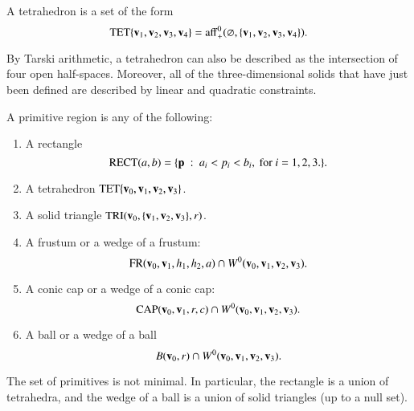 \begin{definition}[tetrahedron]
 A tetrahedron is a set of the form
\[ {\operatorname{TET}}\{{\mathbf v}_1,{\mathbf v}_2,{\mathbf v}_3,{\mathbf v}_4\} = 
{\operatorname{aff}}^0_+(\varnothing,\{{\mathbf v}_1,{\mathbf v}_2,{\mathbf v}_3,{\mathbf v}_4\}).\] 
%
\end{definition}

\begin{remark}
  By Tarski arithmetic, %
  a tetrahedron can also be described as the intersection of four open
  half-spaces. Moreover,  all of
  the three-dimensional solids that have just been defined are
  described by linear and quadratic constraints.  %
\end{remark}

%

\begin{definition}[primitive]\label{def:primitive} 
A primitive region is any of the following:

\begin{enumerate}%
\item A rectangle 
\[ 
{\operatorname{RECT}}(a,b)=\{{\mathbf p} \ :\  a_i < p_i < b_i,\text { for } i=1,2,3.\}.
\] 
\item A tetrahedron ${\operatorname{TET}}\{{\mathbf v}_0,{\mathbf v}_1,{\mathbf v}_2,{\mathbf v}_3\}$.
\item A solid triangle ${\operatorname{TRI}}({\mathbf v}_0,\{{\mathbf v}_1,{\mathbf v}_2,{\mathbf v}_3\},r)$.
%
\item A frustum or a wedge of a frustum:
\[ 
{\operatorname{FR}}({\mathbf v}_0,{\mathbf v}_1,h_1,h_2,a) \cap W^0({\mathbf v}_0,{\mathbf v}_1,{\mathbf v}_2,{\mathbf v}_3).
\] 
\item A conic cap or a wedge of a conic cap: 
\[ 
{\operatorname{CAP}}({\mathbf v}_0,{\mathbf v}_1,r,c) \cap W^0({\mathbf v}_0,{\mathbf v}_1,{\mathbf v}_2,{\mathbf v}_3).
\] 
\item A ball or a wedge of a ball
\[ 
B({\mathbf v}_0,r) \cap W^0({\mathbf v}_0,{\mathbf v}_1,{\mathbf v}_2,{\mathbf v}_3).
\] 
%
%
%
%
%
%
%
\label{enum:volume-prim}
\end{enumerate}
The set of primitives is not minimal.  In particular, the
rectangle is a union of tetrahedra, and the wedge of a ball is a union of
solid triangles (up to a null set).

\end{definition}

